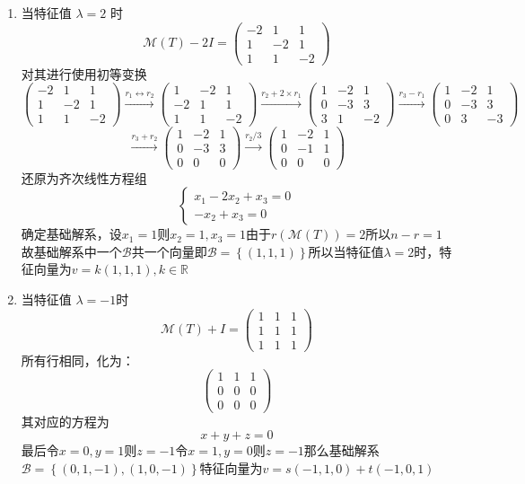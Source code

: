 \begin{example}
	\begin{enumerate}
		\item 当特征值 $\lambda = 2$ 时$$\mathcal{M}(T) - 2I = \begin{pmatrix} -2 & 1 & 1 \\ 1 & -2 & 1 \\ 1 & 1 & -2 \end{pmatrix}$$对其进行使用初等变换$$ \begin{pmatrix} -2 & 1 & 1 \\ 1 & -2 & 1 \\ 1 & 1 & -2 \end{pmatrix}\xrightarrow{r_1\leftrightarrow r_2}\begin{pmatrix} 1 & -2 & 1 \\ -2 & 1 & 1 \\ 1 & 1 & -2 \end{pmatrix}\xrightarrow{r_2+2\times r_1}\begin{pmatrix} 1 & -2 & 1 \\ 0 & -3 & 3 \\ 3 & 1 & -2 \end{pmatrix}\xrightarrow{r_3-r_1}\begin{pmatrix} 1 & -2 & 1 \\ 0 & -3 & 3 \\ 0 & 3 & -3 \end{pmatrix}$$$$\xrightarrow{r_3+ r_2}\begin{pmatrix} 1 & -2 & 1 \\ 0 & -3 & 3 \\ 0 & 0 & 0 \end{pmatrix}\xrightarrow{r_2/3}\begin{pmatrix} 1 & -2 & 1 \\ 0 & -1 & 1 \\ 0 & 0 & 0 \end{pmatrix}$$还原为齐次线性方程组$$\left\{\begin{matrix} 
  		x_1-2x_2+x_3=0 \\  
  		-x_2+x_3=0 
		\end{matrix}\right. $$确定基础解系，设$x_1=1$则$x_2=1,x_3=1$由于$r(\mathcal{M}(T))=2$所以$n-r=1$故基础解系中一个$\mathcal{B}$共一个向量即$\mathcal{B}=\left\{ (1,1,1) \right\}$所以当特征值$\lambda=2$时，特征向量为$v=k(1,1,1),k\in \mathbb{R}$
		\item 当特征值 $\lambda = -1$时$$\mathcal{M}(T) + I = \begin{pmatrix} 1 & 1 & 1 \\ 1 & 1 & 1 \\ 1 & 1 & 1 \end{pmatrix}$$所有行相同，化为：$$\begin{pmatrix} 1 & 1 & 1 \\ 0 & 0 & 0 \\ 0 & 0 & 0 \end{pmatrix}$$其对应的方程为$$x+y+z=0$$最后令$x=0,y=1$则$z=-1$令$x=1,y=0$则$z=-1$那么基础解系$\mathcal{B}=\left\{ (0,1,-1),(1,0,-1) \right\}$特征向量为$v=s(-1, 1, 0) + t(-1, 0, 1)$
	\end{enumerate}
\end{example}


